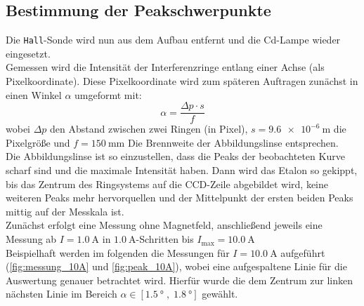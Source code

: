 \subsection{Bestimmung der Peakschwerpunkte}
Die \texttt{Hall}-Sonde wird nun aus dem Aufbau entfernt und die Cd-Lampe wieder eingesetzt.\\
Gemessen wird die Intensität der Interferenzringe entlang einer Achse (als Pixelkoordinate).
Diese Pixelkoordinate wird zum späteren Auftragen zunächst in einen Winkel $\alpha$ umgeformt mit:
\begin{equation*}
    \alpha = \frac{\Delta p \cdot s}{f}
\end{equation*}
wobei $\Delta p$ den Abstand zwischen zwei Ringen (in Pixel), $s=\SI{9.6e-6}{\meter}$ die Pixelgröße und $f=\SI{150}{\milli\meter}$ Die Brennweite der Abbildungslinse entsprechen.\\
Die Abbildungslinse ist so einzustellen, dass die Peaks der beobachteten Kurve scharf sind und die maximale Intensität haben. Dann wird das Etalon so gekippt, bis das Zentrum des Ringsystems auf die CCD-Zeile abgebildet wird, keine weiteren Peaks mehr hervorquellen und der Mittelpunkt der ersten beiden Peaks mittig auf der Messkala ist.\\
Zunächst erfolgt eine Messung ohne Magnetfeld, anschließend jeweils eine Messung ab $I=\SI{1.0}{\ampere}$ in $\SI{1.0}{\ampere}$-Schritten bis $I_{\text{max}}=\SI{10,0}{\ampere}$\\
Beispielhaft werden im folgenden die Messungen für $I = \SI{10,0}{\ampere}$ aufgeführt (\cref{fig:messung_10A} und \cref{fig:peak_10A}), wobei eine aufgespaltene Linie für die Auswertung genauer betrachtet wird. Hierfür wurde die dem Zentrum zur linken nächsten Linie im Bereich $\alpha \in \left[\SI{1.5}{\degree}\; ,\;\SI{1.8}{\degree}\right]$ gewählt.
